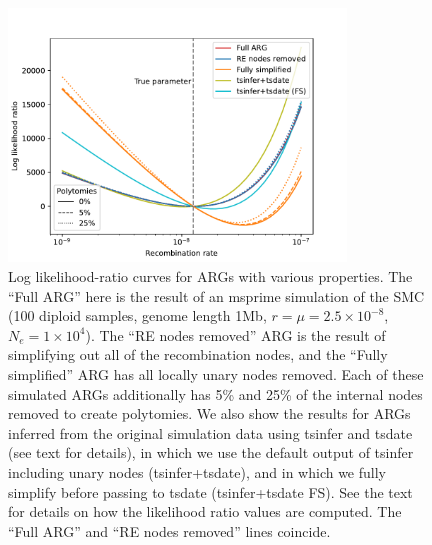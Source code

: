 \documentclass{article}
\begin{document}
\begin{figure}
    \centering
    \includegraphics[width=0.8\textwidth]{figures/likelihood_surface}
    \caption{Log likelihood-ratio curves for ARGs with various properties.
    The ``Full ARG'' here is the result of an
    msprime simulation of the SMC (100 diploid samples, genome length 1Mb,
    $r=\mu=2.5\times10^{-8}$, $N_e=1\times10^4$).
    The ``RE nodes removed'' ARG is the
    result of simplifying out all of the recombination nodes,
    and the ``Fully simplified'' ARG has all locally unary nodes removed.
    Each of these simulated ARGs additionally has 5\% and 25\% of the
    internal nodes removed to create polytomies.
    We also show the results for ARGs inferred from the original simulation
    data using tsinfer and tsdate
    (see text for details), in which we use the default output of tsinfer
    including unary nodes (tsinfer+tsdate), and in which we fully simplify
    before passing to tsdate (tsinfer+tsdate FS).
    See the text for details on how the likelihood ratio
    values are computed.
    The ``Full ARG'' and ``RE nodes removed'' lines coincide.
    \label{fig:lik-surface}}
\end{figure}
\end{document}
